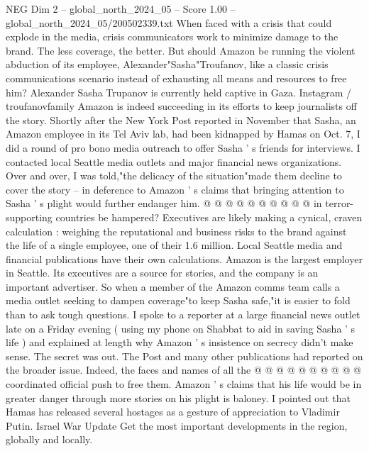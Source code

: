 \begin{textsample}{NEG Dim 2 – global\_north\_2024\_05 – Score 1.00 – global\_north\_2024\_05/200502339.txt}  \label{ex:f2_neg_149}
When faced with a crisis that could explode in the media, crisis communicators work to minimize damage to the brand.
The less coverage, the better.
But should Amazon be running the violent abduction of its employee, Alexander"Sasha"Troufanov, like a classic crisis communications scenario instead of exhausting all means and resources to free him?
Alexander Sasha Trupanov is currently held captive in Gaza.
Instagram / troufanovfamily Amazon is indeed succeeding in its efforts to keep journalists off the story.
Shortly after the New York Post reported in November that Sasha, an Amazon employee in its Tel Aviv lab, had been kidnapped by Hamas on Oct. 7, I did a round of pro bono media outreach to offer Sasha ' s friends for interviews.
I contacted local Seattle media outlets and major financial news organizations.
Over and over, I was told,"the delicacy of the situation"made them decline to cover the story -- in deference to Amazon ' s claims that bringing attention to Sasha ' s plight would further endanger him. @ @ @ @ @ @ @ @ @ @ in terror-supporting countries be hampered?
Executives are likely making a cynical, craven calculation : weighing the reputational and business risks to the brand against the life of a single employee, one of their 1.6 million.
Local Seattle media and financial publications have their own calculations.
Amazon is the largest employer in Seattle.
Its executives are a source for stories, and the company is an important advertiser.
So when a member of the Amazon comms team calls a media outlet seeking to dampen coverage"to keep Sasha safe,"it is easier to fold than to ask tough questions.
I spoke to a reporter at a large financial news outlet late on a Friday evening ( using my phone on Shabbat to aid in saving Sasha ' s life ) and explained at length why Amazon ' s insistence on secrecy didn't make sense.
The secret was out.
The Post and many other publications had reported on the broader issue.
Indeed, the faces and names of all the @ @ @ @ @ @ @ @ @ @ coordinated official push to free them.
Amazon ' s claims that his life would be in greater danger through more stories on his plight is baloney.
I pointed out that Hamas has released several hostages as a gesture of appreciation to Vladimir Putin.
Israel War Update Get the most important developments in the region, globally and locally.

\end{textsample}
